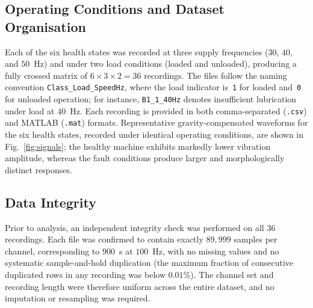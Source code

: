 \subsection{Operating Conditions and Dataset Organisation}
Each of the six health states was recorded at three supply frequencies
($30$, $40$, and $50$~Hz) and under two load conditions (loaded and unloaded),
producing a fully crossed matrix of $6\times3\times2 = 36$ recordings. The files
follow the naming convention \texttt{Class\_Load\_SpeedHz}, where the load
indicator is~\texttt{1} for loaded and~\texttt{0} for unloaded operation; for
instance, \texttt{B1\_1\_40Hz} denotes insufficient lubrication under load at
$40$~Hz. Each recording is provided in both comma-separated (\texttt{.csv}) and
MATLAB (\texttt{.mat}) formats. Representative gravity-compensated waveforms for
the six health states, recorded under identical operating conditions, are shown
in Fig.~\ref{fig:signals}; the healthy machine exhibits markedly lower vibration
amplitude, whereas the fault conditions produce larger and morphologically
distinct responses.

\subsection{Data Integrity}
Prior to analysis, an independent integrity check was performed on all $36$
recordings. Each file was confirmed to contain exactly $89{,}999$ samples per
channel, corresponding to $900$~s at $100$~Hz, with no missing values and no
systematic sample-and-hold duplication (the maximum fraction of consecutive
duplicated rows in any recording was below $0.01\%$). The channel set and
recording length were therefore uniform across the entire dataset, and no
imputation or resampling was required.

